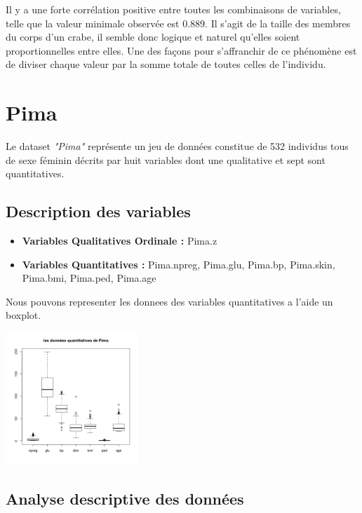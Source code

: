 \documentclass[10pt]{article}
\begin{document}
	Il y a une forte corrélation positive entre toutes les combinaisons de variables, telle que la valeur minimale observée est 0.889. 
	Il s'agit de la taille des membres du corps d'un crabe, il semble donc logique et naturel qu'elles soient proportionnelles entre elles.
	Une des façons pour s'affranchir de ce phénomène est de diviser chaque valeur par la somme totale de toutes celles de l'individu.
	
	
	\section{Pima}
	Le dataset \textit{"Pima"} représente un jeu de données constitue de 532 individus tous de sexe féminin décrits par huit variables dont une qualitative et sept sont quantitatives.
	
	\subsection{Description des variables}
	
	
	\begin{itemize}
		\item \textbf{Variables Qualitatives Ordinale :}  Pima.z
		\item \textbf{Variables Quantitatives : } Pima.npreg, Pima.glu, Pima.bp, Pima.skin, Pima.bmi, Pima.ped, Pima.age
	\end{itemize}
	
	Nous pouvons representer les donnees des variables quantitatives a l'aide un boxplot.
	\begin{center}
		\includegraphics[width=50mm]{Figures/Pima/bxp_Pimaquant.png}
		\label{fig:boxplot_pima_quantitatives}
	\end{center}
	
	\subsection{Analyse descriptive des données}
	
\end{document}
